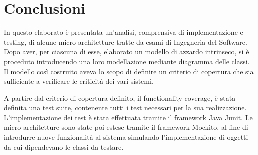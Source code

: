 \chapter{Conclusioni}

In questo elaborato è presentata un'analisi, comprensiva di implementazione e testing, di alcune micro-architetture tratte da esami di Ingegneria del Software.
Dopo aver, per ciascuna di esse, elaborato un modello di azzardo intrinseco, si è proceduto introducendo una loro modellazione mediante diagramma delle classi.
Il modello così costruito aveva lo scopo di definire un criterio di copertura che sia sufficiente a verificare le criticità dei vari sistemi.

A partire dal criterio di copertura definito, il functionality coverage, è stata definita una test suite, contenente tutti i test necessari per la sua realizzazione. L'implementazione dei test è stata effettuata tramite il framework Java Junit.
Le micro-architetture sono state poi estese tramite il framework Mockito, al fine di introdurre nuove funzionalità al sistema simulando l'implementazione di oggetti da cui dipendevano le classi da testare.